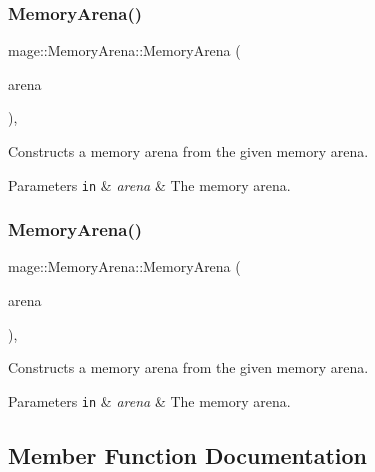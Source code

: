 \subsubsection{\texorpdfstring{Memory\+Arena()}{MemoryArena()}\hspace{0.1cm}{\footnotesize\ttfamily [2/3]}}
{\footnotesize\ttfamily mage\+::\+Memory\+Arena\+::\+Memory\+Arena (\begin{DoxyParamCaption}\item[{const \hyperlink{classmage_1_1_memory_arena}{Memory\+Arena} \&}]{arena }\end{DoxyParamCaption})\hspace{0.3cm}{\ttfamily [private]}, {\ttfamily [delete]}}

Constructs a memory arena from the given memory arena.


\begin{DoxyParams}[1]{Parameters}
\mbox{\tt in}  & {\em arena} & The memory arena. \\
\hline
\end{DoxyParams}
\hypertarget{classmage_1_1_memory_arena_a729e5745729e3e59f81fd05125d3cf37}{}\label{classmage_1_1_memory_arena_a729e5745729e3e59f81fd05125d3cf37} 
\subsubsection{\texorpdfstring{Memory\+Arena()}{MemoryArena()}\hspace{0.1cm}{\footnotesize\ttfamily [3/3]}}
{\footnotesize\ttfamily mage\+::\+Memory\+Arena\+::\+Memory\+Arena (\begin{DoxyParamCaption}\item[{\hyperlink{classmage_1_1_memory_arena}{Memory\+Arena} \&\&}]{arena }\end{DoxyParamCaption})\hspace{0.3cm}{\ttfamily [private]}, {\ttfamily [delete]}}

Constructs a memory arena from the given memory arena.


\begin{DoxyParams}[1]{Parameters}
\mbox{\tt in}  & {\em arena} & The memory arena. \\
\hline
\end{DoxyParams}


\subsection{Member Function Documentation}
\hypertarget{classmage_1_1_memory_arena_a2e63b11c535dbfefd69d071466be9ce1}{}\label{classmage_1_1_memory_arena_a2e63b11c535dbfefd69d071466be9ce1} 
